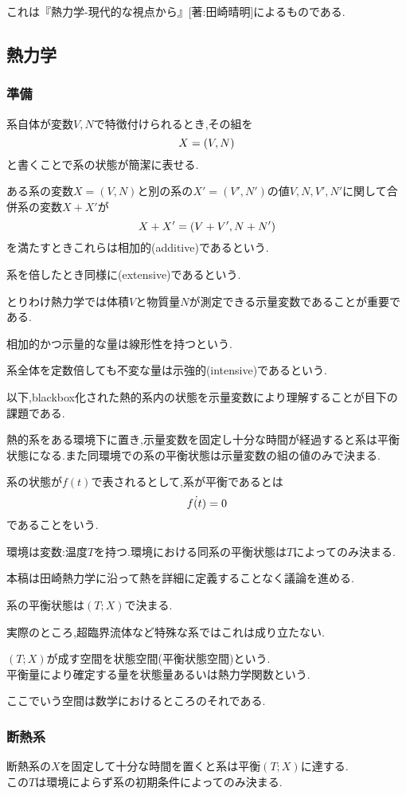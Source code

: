 \documentclass{dvipdfmx,uplatex}[jsarticle]
\begin{document}
これは『熱力学-現代的な視点から』[著:田崎晴明]によるものである.
\subsection{熱力学}
\subsubsection{準備}
系自体が変数$V,N$で特徴付けられるとき,その組を
\[
X = (V,N) \\
\]
と書くことで系の状態が簡潔に表せる.
\begin{def}
ある系の変数$X = (V,N)$と別の系の$X' = (V',N')$の値$V,N,V',N'$に関して合併系の変数$X+X'$が
\[
X + X' = (V+V', N+N') \\
\]
を満たすときこれらは相加的(additive)であるという.
\end{def}

\begin{def}
系を\lambda 倍したとき同様に(extensive)であるという.
\end{def}
とりわけ熱力学では体積$V$と物質量$N$が測定できる示量変数であることが重要である.
\begin{cf}
相加的かつ示量的な量は線形性を持つという.
\end{cf}
\begin{def}
系全体を定数倍しても不変な量は示強的(intensive)であるという.
\end{def}


以下,blackbox化された熱的系内の状態を示量変数により理解することが目下の課題である.

\begin{law}
熱的系をある環境下に置き,示量変数を固定し十分な時間が経過すると系は平衡状態になる.また同環境での系の平衡状態は示量変数の組の値のみで決まる.
\end{law}
\begin{def}
系の状態が$f(t)$で表されるとして,系が平衡であるとは \\
\[
\dot{f(t)} = 0 \\
\]
であることをいう.
\end{def}
\begin{law}
環境は変数:温度$T$を持つ.環境における同系の平衡状態は$T$によってのみ決まる.
\end{law}
本稿は田崎熱力学に沿って熱を詳細に定義することなく議論を進める.

\begin{theo}
系の平衡状態は$(T;X)$で決まる.
\end{theo}
実際のところ,超臨界流体など特殊な系ではこれは成り立たない.

\begin{def}
$(T;X)$が成す空間を状態空間(平衡状態空間)という. \\
平衡量により確定する量を状態量あるいは熱力学関数という.
\end{def}
ここでいう空間は数学におけるところのそれである.

\subsubsection{断熱系}
\begin{law}
断熱系の$X$を固定して十分な時間を置くと系は平衡$(T;X)$に達する. \\
この$T$は環境によらず系の初期条件によってのみ決まる.
\end{law}
\end{document}
